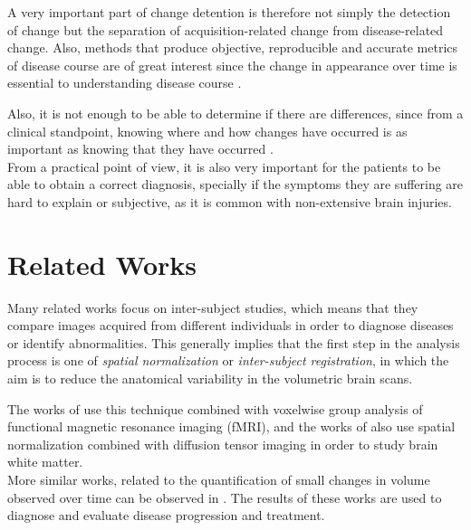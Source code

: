 A very important part of change detention is therefore not simply the detection of change but the separation of acquisition-related change from disease-related change. Also, methods that produce objective, reproducible and accurate metrics of disease course are of great interest since the change in appearance over time is essential to understanding disease course \cite{review1}.

Also, it is not enough to be able to determine if there are differences, since from a clinical standpoint, knowing where and how changes have occurred is as important as knowing that they have occurred \cite{review1}.\\


From a practical point of view, it is also very important for the patients to be able to obtain a correct diagnosis, specially if the symptoms they are suffering are hard to explain or subjective, as it is common with non-extensive brain injuries.

\section{Related Works}
Many related works focus on inter-subject studies, which means that they compare images acquired from different individuals in order to diagnose diseases or identify abnormalities. This generally implies that the first step in the analysis process is one of \textit{spatial normalization} or \textit{inter-subject registration}, in which the aim is to reduce the anatomical variability in the volumetric brain scans.

The works of \cite{zeffiro,svensen} use this technique combined with voxelwise group analysis of functional magnetic resonance imaging (fMRI), and the works of \cite{ardekani1,jones} also use spatial normalization combined with diffusion tensor imaging in order to study brain white matter.\\

More similar works, related to the quantification of small changes in volume observed over time can be observed in \cite{holden,rey}. The results of these works are used to diagnose and evaluate disease progression and treatment.


